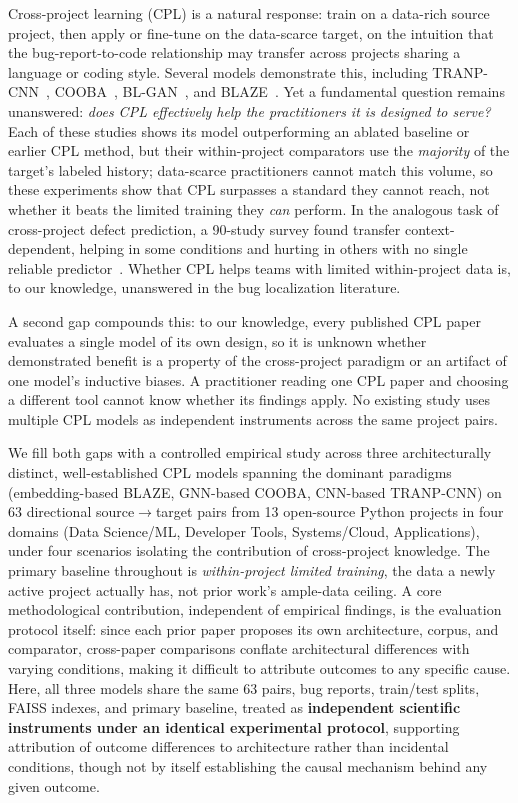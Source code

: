 \documentclass[a4paper,fleqn]{cas-dc}
\begin{document}
Cross-project learning (CPL) is a natural response: train on a data-rich source project, then apply or fine-tune on the data-scarce target, on the intuition that the bug-report-to-code relationship may transfer across projects sharing a language or coding style. Several models demonstrate this, including TRANP-CNN~\citep{huo2019deep}, COOBA~\citep{zhu2020cooba}, BL-GAN~\citep{zhu2022bl}, and BLAZE~\citep{chakraborty2025blaze}. Yet a fundamental question remains unanswered: \textit{does CPL effectively help the practitioners it is designed to serve?} Each of these studies shows its model outperforming an ablated baseline or earlier CPL method, but their within-project comparators use the \emph{majority} of the target's labeled history; data-scarce practitioners cannot match this volume, so these experiments show that CPL surpasses a standard they cannot reach, not whether it beats the limited training they \emph{can} perform. In the analogous task of cross-project defect prediction, a 90-study survey found transfer context-dependent, helping in some conditions and hurting in others with no single reliable predictor~\citep{hosseini2017systematic,zhang2022negative}. Whether CPL helps teams with limited within-project data is, to our knowledge, unanswered in the bug localization literature.

A second gap compounds this: to our knowledge, every published CPL paper evaluates a single model of its own design, so it is unknown whether demonstrated benefit is a property of the cross-project paradigm or an artifact of one model's inductive biases. A practitioner reading one CPL paper and choosing a different tool cannot know whether its findings apply. No existing study uses multiple CPL models as independent instruments across the same project pairs.

We fill both gaps with a controlled empirical study across three architecturally distinct, well-established CPL models spanning the dominant paradigms (embedding-based BLAZE, GNN-based COOBA, CNN-based TRANP-CNN) on 63 directional source$\to$target pairs from 13 open-source Python projects in four domains (Data Science/ML, Developer Tools, Systems/Cloud, Applications), under four scenarios isolating the contribution of cross-project knowledge. The primary baseline throughout is \emph{within-project limited training}, the data a newly active project actually has, not prior work's ample-data ceiling. A core methodological contribution, independent of empirical findings, is the evaluation protocol itself: since each prior paper proposes its own architecture, corpus, and comparator, cross-paper comparisons conflate architectural differences with varying conditions, making it difficult to attribute outcomes to any specific cause. Here, all three models share the same 63 pairs, bug reports, train/test splits, FAISS indexes, and primary baseline, treated as \textbf{independent scientific instruments under an identical experimental protocol}, supporting attribution of outcome differences to architecture rather than incidental conditions, though not by itself establishing the causal mechanism behind any given outcome.
\end{document}
